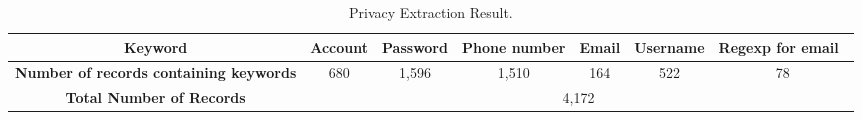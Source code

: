 \begin{table}[t]
	\centering
	\begin{tabular}{|c|c|c|c|c|c|c|}
		\hline
		\textbf{Keyword}                               & Account & Password & Phone number & Email & Username & Regexp for email~  \\
		\hline
		\textbf{Number of records containing keywords} & 680     & 1,596     & 1,510         & 164   & 522      & 78                 \\
		\hline
		\textbf{Total Number of Records} & \multicolumn{6}{c|}{4,172} \\
		\hline
	\end{tabular}
	\linebreak
	\caption{Privacy Extraction Result.}
	\label{table:information_extracted}
\end{table}

\fi
